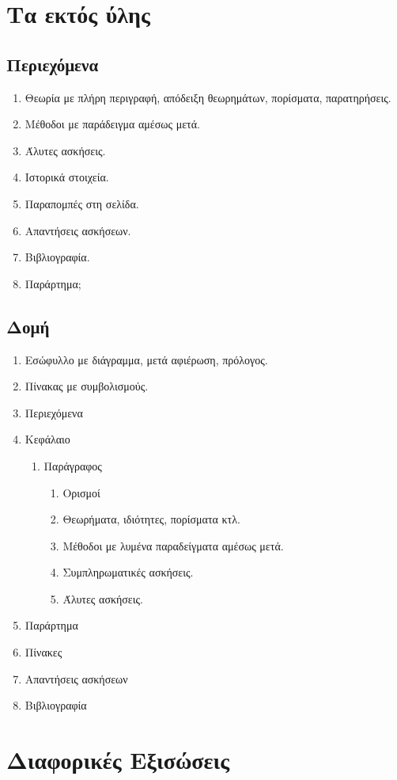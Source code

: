\documentclass[11pt,a4paper]{book}
\begin{document}
\section{Τα εκτός ύλης}
\subsection{Περιεχόμενα}
\begin{enumerate}
\item Θεωρία με πλήρη περιγραφή, απόδειξη θεωρημάτων, πορίσματα, παρατηρήσεις.
\item Μέθοδοι με παράδειγμα αμέσως μετά.
\item Άλυτες ασκήσεις.
\item Ιστορικά στοιχεία.
\item Παραπομπές στη σελίδα.
\item Απαντήσεις ασκήσεων.
\item Βιβλιογραφία.
\item Παράρτημα;
\end{enumerate}
\subsection{Δομή}
\begin{enumerate}
\item Εσώφυλλο με διάγραμμα, μετά αφιέρωση, πρόλογος.
\item Πίνακας με συμβολισμούς.
\item Περιεχόμενα
\item Κεφάλαιο
\begin{enumerate}
\item Παράγραφος
\begin{enumerate}
\item Ορισμοί
\item Θεωρήματα, ιδιότητες, πορίσματα κτλ.
\item Μέθοδοι με λυμένα παραδείγματα αμέσως μετά.
\item Συμπληρωματικές ασκήσεις.
\item Άλυτες ασκήσεις.
\end{enumerate}
\end{enumerate}
\item Παράρτημα
\item Πίνακες
\item Απαντήσεις ασκήσεων
\item Βιβλιογραφία
\end{enumerate}
\section{Διαφορικές Εξισώσεις}
\end{document}
